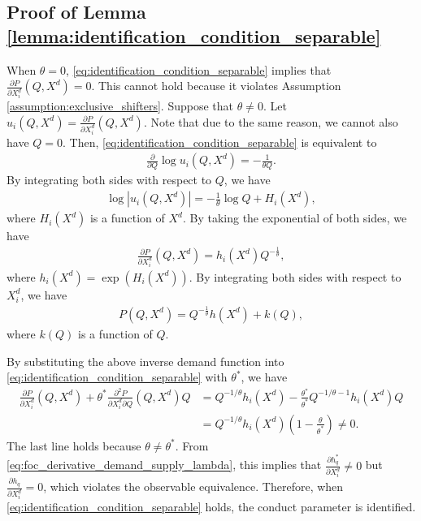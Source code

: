 \documentclass[11pt, a4paper]{article}
\theoremstyle{remark}
\begin{document}
\subsection{Proof of Lemma \ref{lemma:identification_condition_separable}}
When $\theta = 0$, \eqref{eq:identification_condition_separable} implies that $\frac{\partial P}{\partial X^{d}_i}(Q, X^{d}) = 0$.
This cannot hold because it violates Assumption \ref{assumption:exclusive_shifters}.
Suppose that $\theta \ne 0$.
Let $u_i(Q, X^{d}) = \frac{\partial P}{\partial X^{d}_i}(Q, X^{d})$.
Note that due to the same reason, we cannot also have $Q = 0$.
Then, \eqref{eq:identification_condition_separable} is equivalent to
\begin{align}
    \frac{\partial }{\partial Q}\log u_i(Q, X^{d})= -\frac{1}{\theta Q}.
\end{align}
By integrating both sides with respect to $Q$, we have
\begin{align}
    \log |u_i(Q, X^{d})| = -\frac{1}{\theta}\log Q + H_i(X^{d}),
\end{align}
where $H_i(X^{d})$ is a function of $X^{d}$.
By taking the exponential of both sides, we have
\begin{align}
    \frac{\partial P}{\partial X^{d}_i}(Q, X^{d}) = h_i(X^{d})Q^{-\frac{1}{\theta}},
\end{align}
where $h_i(X^{d})  = \exp(H_i(X^{d}))$.
By integrating both sides with respect to $X^{d}_i$, we have
\begin{align}
    P(Q, X^{d}) = Q^{-\frac{1}{\theta}}h(X^{d}) + k(Q),
\end{align}
where $k(Q)$ is a function of $Q$.

By substituting the above inverse demand function into \eqref{eq:identification_condition_separable} with $\theta^{*}$, we have
\begin{align}
    \frac{\partial P}{\partial X^{d}_{i}}(Q, X^{d}) + \theta^{*}\frac{\partial^2 P}{\partial X^{d}_{i}\partial Q}(Q, X^{d})Q  &= Q^{-1/\theta} h_i(X^d) - \frac{\theta^{*}}{\theta^{*}} Q^{-1/\theta-1} h_i(X^d) Q\\
    &= Q^{-1/\theta} h_i(X^d) \left(1 - \frac{\theta}{\theta^{*}} \right) \ne 0.
\end{align}
The last line holds because $\theta \ne \theta^{*}$.
From \eqref{eq:foc_derivative_demand_supply_lambda}, this implies that $\frac{\partial h_q^{*}}{\partial X^{d}_i} \ne 0$ but $\frac{\partial h_q}{\partial X^{d}_i} = 0$, which violates the observable equivalence.
Therefore, when \eqref{eq:identification_condition_separable} holds, the conduct parameter is identified.
\end{document}
